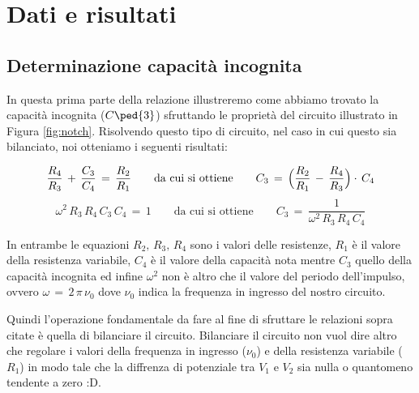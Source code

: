\section*{Dati e risultati}

\subsection*{Determinazione capacità incognita}

In questa prima parte della relazione illustreremo come abbiamo trovato la capacità incognita ($C\ped{3}$) sfruttando le proprietà del circuito illustrato in Figura \ref{fig:notch}.
Risolvendo questo tipo di circuito, nel caso in cui questo sia bilanciato, noi otteniamo i seguenti risultati:

\begin{equation}
	\frac{R_4}{R_3} \,+\, \frac{C_3}{C_4} \,=\, \frac{R_2}{R_1} \qquad \text{da cui si ottiene} \qquad C_3 \,=\, \Bigl(\frac{R_2}{R_1} \,-\, \frac{R_4}{R_3}\Bigr)\cdot\,C_4
	\label{eq:C}
\end{equation}
\begin{equation}
	\omega^2\,R_3\,R_4\,C_3\,C_4 \,=\, 1 \qquad \text{da cui si ottiene} \qquad C_3 \,=\, \frac{1}{\omega^2\,R_3\,R_4\,C_4}
	\label{eq:C_imm}
\end{equation}
%

In entrambe le equazioni $R_2,\,R_3,\,R_4$ sono i valori delle resistenze, $R_1$ è il valore della resistenza variabile, $C_4$ è il valore della capacità nota mentre $C_3$ quello della capacità incognita ed infine $\omega^2$ non è altro che il valore del periodo dell'impulso, ovvero $\omega \,=\, 2\,\pi\,\nu_0$ dove $\nu_0$ indica la frequenza in ingresso del nostro circuito.

Quindi l'operazione fondamentale da fare al fine di sfruttare le relazioni sopra citate è quella di bilanciare il circuito. Bilanciare il circuito non vuol dire altro che regolare i valori della frequenza in ingresso ($\nu_0$) e della resistenza variabile ($R_1$) in modo tale che la diffrenza di potenziale tra $V_1$ e $V_2$ sia nulla o quantomeno tendente a zero :D.
